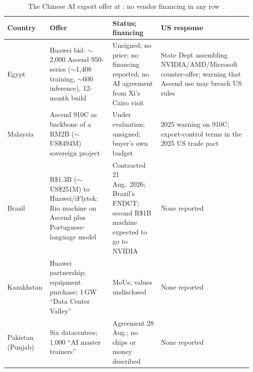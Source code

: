 \begin{table}[htbp]
\centering\footnotesize
\caption{The Chinese AI export offer at \datafreeze: no vendor financing in any row~\cite{huawei-egypt,huawei-malaysia,brazil-ai-supercomputer,kazakh-huawei}.}
\label{tab:export-offer-c}
\begin{tabular}{@{}p{16mm}p{52mm}p{38mm}p{38mm}@{}}
\toprule
\textbf{Country} & \textbf{Offer} & \textbf{Status; financing} & \textbf{US response} \\
\midrule
Egypt & Huawei bid: $\sim$2,000 Ascend 950-series ($\sim$1,408 training, $\sim$600 inference), 12-month build & Unsigned; no price; no financing reported; no AI agreement from Xi's Cairo visit & State Dept assembling NVIDIA/AMD/Microsoft counter-offer; warning that Ascend use may breach US rules \\
\addlinespace
Malaysia & Ascend 910C as backbone of a RM2B ($\sim$US\$494M) sovereign project & Under evaluation; unsigned; buyer's own budget & 2025 warning on 910C; export-control terms in the 2025 US trade pact \\
\addlinespace
Brazil & R\$1.3B ($\sim$US\$251M) to Huawei/iFlytek: Rio machine on Ascend plus Portuguese-language model & Contracted 21 Aug.\ 2026; Brazil's FNDCT; second R\$1B machine expected to go to NVIDIA & None reported \\
\addlinespace
Kazakhstan & Huawei partnership; equipment purchase; 1\,GW ``Data Center Valley'' & MoUs; values undisclosed & None reported \\
\addlinespace
Pakistan (Punjab) & Six datacentres; 1,000 ``AI master trainers'' & Agreement 28 Aug.; no chips or money described & None reported \\
\bottomrule
\end{tabular}
\end{table}

